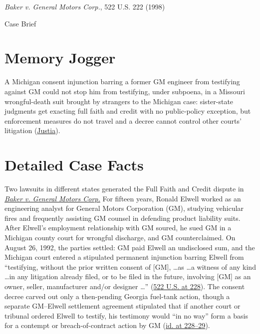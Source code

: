 \documentclass[12pt]{article}
\begin{document}
\begin{center}
{\LARGE \textit{Baker v. General Motors Corp.}, 522 U.S. 222 (1998)\par}
\vspace{0.8em}
{\large Case Brief\par}
\end{center}
\vspace{1em}

\section{Memory Jogger}
A Michigan consent injunction barring a former GM engineer from testifying against GM could not stop him from testifying, under subpoena, in a Missouri wrongful-death suit brought by strangers to the Michigan case: sister-state judgments get exacting full faith and credit with no public-policy exception, but enforcement measures do not travel and a decree cannot control other courts' litigation (\href{https://supreme.justia.com/cases/federal/us/522/222/}{Justia}).

\section{Detailed Case Facts}
Two lawsuits in different states generated the Full Faith and Credit dispute in \href{https://www.law.cornell.edu/supct/html/96-653.ZO.html}{\textit{Baker v. General Motors Corp.}} For fifteen years, Ronald Elwell worked as an engineering analyst for General Motors Corporation (GM), studying vehicular fires and frequently assisting GM counsel in defending product liability suits. After Elwell's employment relationship with GM soured, he sued GM in a Michigan county court for wrongful discharge, and GM counterclaimed. On August 26, 1992, the parties settled: GM paid Elwell an undisclosed sum, and the Michigan court entered a stipulated permanent injunction barring Elwell from ``testifying, without the prior written consent of [GM], \ldots as \ldots a witness of any kind \ldots in any litigation already filed, or to be filed in the future, involving [GM] as an owner, seller, manufacturer and/or designer \ldots'' (\href{https://www.law.cornell.edu/supct/html/96-653.ZO.html}{522 U.S. at 228}). The consent decree carved out only a then-pending Georgia fuel-tank action, though a separate GM--Elwell settlement agreement stipulated that if another court or tribunal ordered Elwell to testify, his testimony would ``in no way'' form a basis for a contempt or breach-of-contract action by GM (\href{https://www.law.cornell.edu/supct/html/96-653.ZO.html}{id. at 228--29}).
\end{document}
